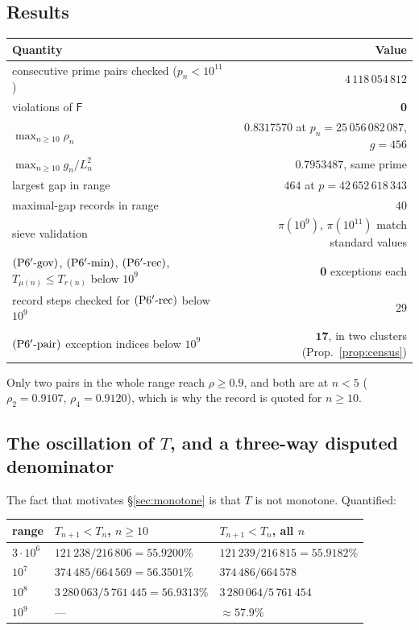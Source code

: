 \documentclass[11pt,a4paper]{article}
\theoremstyle{plain}
\theoremstyle{definition}
\theoremstyle{remark}
\newcommand{\Fb}{\mathsf{F}}
\newcommand{\Ppair}{\textup{(P6$'$-pair)}}
\newcommand{\Pgov}{\textup{(P6$'$-gov)}}
\newcommand{\Pmin}{\textup{(P6$'$-min)}}
\newcommand{\Prec}{\textup{(P6$'$-rec)}}
\begin{document}
\subsection{Results}

\begin{center}
\small
\begin{tabular}{@{}lr@{}}
\toprule
Quantity & Value \\
\midrule
consecutive prime pairs checked ($p_n < 10^{11}$) & $4\,118\,054\,812$ \\
violations of $\Fb$ & \textbf{0} \\
$\max_{n \ge 10}\rho_n$ & $\mathbf{0.8317570}$ at $p_n = 25\,056\,082\,087$, $g = 456$ \\
$\max_{n \ge 10} g_n/L_n^2$ & $0.7953487$, same prime \\
largest gap in range & $464$ at $p = 42\,652\,618\,343$ \\
maximal-gap records in range & $40$ \\
sieve validation & $\pi(10^9)$, $\pi(10^{11})$ match standard values \\
\midrule
$\Pgov$, $\Pmin$, $\Prec$, $T_{\mu(n)} \le T_{r(n)}$ below $10^9$ & \textbf{0} exceptions each \\
record steps checked for $\Prec$ below $10^9$ & $29$ \\
$\Ppair$ exception indices below $10^9$ & $\mathbf{17}$, in two clusters
  (Prop.~\ref{prop:census}) \\
\bottomrule
\end{tabular}
\end{center}

Only two pairs in the whole range reach $\rho \ge 0.9$, and both are at $n < 5$
($\rho_2 = 0.9107$, $\rho_4 = 0.9120$), which is why the record is quoted for $n \ge 10$.

\subsection{The oscillation of $T$, and a three-way disputed denominator}
\label{sec:oscillation}

The fact that motivates \S\ref{sec:monotone} is that $T$ is not monotone. Quantified:

\begin{center}
\begin{tabular}{@{}lll@{}}
\toprule
range & $T_{n+1} < T_n$, $n \ge 10$ & $T_{n+1} < T_n$, all $n$ \\
\midrule
$3\cdot10^6$ & $121\,238 / 216\,806 = \mathbf{55.9200\%}$ & $121\,239/216\,815 = 55.9182\%$ \\
$10^7$       & $374\,485 / 664\,569 = 56.3501\%$ & $374\,486/664\,578$ \\
$10^8$       & $3\,280\,063 / 5\,761\,445 = 56.9313\%$ & $3\,280\,064/5\,761\,454$ \\
$10^9$       & --- & $\approx 57.9\%$ \\
\bottomrule
\end{tabular}
\end{center}
\end{document}
